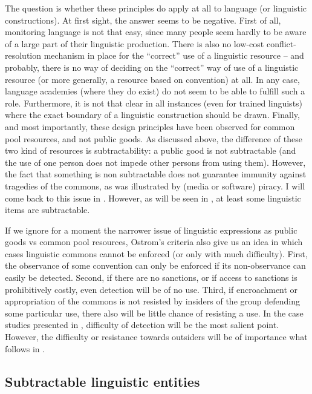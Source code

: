 \documentclass[output=paper,hidelinks]{langscibook}
\begin{document}
The question is whether these principles do apply at all to language (or linguistic constructions). At first sight, the answer seems to be negative. First of all, monitoring language is not that easy, since many people seem hardly to be aware of a large part of their linguistic production. There is also no low-cost conflict-resolution mechanism in place for the ``correct'' use of a linguistic resource -- and probably, there is no way of deciding on the ``correct'' way of use of a linguistic  resource (or more generally, a resource based on convention) at all. In any case, language academies (where they do exist) do not seem to be able to fulfill such a role. Furthermore, it is not that clear in all instances (even for trained linguists) where the exact boundary of a linguistic construction should be drawn. Finally, and most importantly, these design principles have been observed for common pool resources, and not public goods. As discussed above, the difference of these two kind of resources is subtractability: a public good is not subtractable (and the use of one person does not impede other persons from using them). However, the fact that something is non subtractable does not guarantee immunity against tragedies of the commons, as was illustrated by (media or software) piracy. I will come back to this issue in . However, as will be seen in , at least some linguistic items are subtractable.

If we ignore for a moment the narrower issue of linguistic expressions as public goods vs common pool resources, Ostrom's criteria also give us an idea in which cases linguistic commons cannot be enforced (or only with much difficulty). First, the observance of some convention can only be enforced if its non-observance can easily be detected. Second, if there are no sanctions, or if access to sanctions is prohibitively costly, even detection will be of no use. Third, if encroachment or appropriation of the commons is not resisted by insiders of the group defending some particular use, there also will be little chance of resisting a use. In the case studies presented in , difficulty of detection will be the most salient point. However, the difficulty or resistance towards outsiders will be of importance what follows in .


\subsection{Subtractable linguistic entities}
\label{sec:some-ling-reso}
\end{document}
